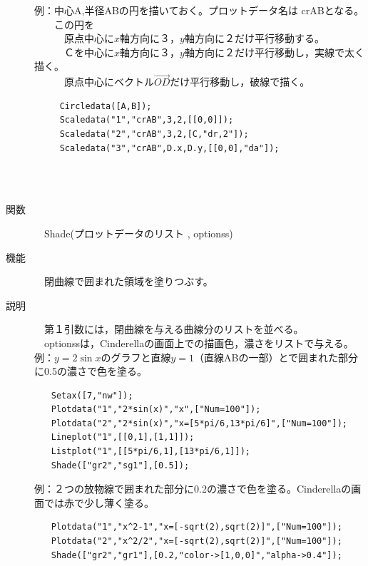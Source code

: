 \documentclass[papersize,a4paper,12pt,uplatex]{jsarticle}
\begin{document}
\begin{description}
例：中心A,半径ABの円を描いておく。プロットデータ名は crABとなる。\\
　　この円を\\
　　　原点中心に$x$軸方向に３，$y$軸方向に２だけ平行移動する。\\
　　　Ｃを中心に$x$軸方向に３，$y$軸方向に２だけ平行移動し，実線で太く描く。\\
　　　原点中心にベクトル$\overrightarrow{OD} $だけ平行移動し，破線で描く。
\begin{verbatim}
　　　Circledata([A,B]);
　　　Scaledata("1","crAB",3,2,[[0,0]]);
　　　Scaledata("2","crAB",3,2,[C,"dr,2"]);
　　　Scaledata("3","crAB",D.x,D.y,[[0,0],"da"]);
\end{verbatim}
　　　　　　　\\
　\\
\hypertarget{shade}{}
\item[関数]　Shade(プロットデータのリスト , optionss)
\item[機能]　閉曲線で囲まれた領域を塗りつぶす。
\item[説明]　第１引数には，閉曲線を与える曲線分のリストを並べる。\\
　optionssは，Cinderellaの画面上での描画色，濃さをリストで与える。\\

例：$y=2\sin x$のグラフと直線$y=1$（直線ABの一部）とで囲まれた部分に0.5の濃さで色を塗る。
\begin{verbatim}
　　Setax([7,"nw"]);
　　Plotdata("1","2*sin(x)","x",["Num=100"]);
　　Plotdata("2","2*sin(x)","x=[5*pi/6,13*pi/6]",["Num=100"]);
　　Lineplot("1",[[0,1],[1,1]]);
　　Listplot("1",[[5*pi/6,1],[13*pi/6,1]]);
　　Shade(["gr2","sg1"],[0.5]);
\end{verbatim}
\begin{center}

\end{center}

例：２つの放物線で囲まれた部分に0.2の濃さで色を塗る。Cinderellaの画面では赤で少し薄く塗る。
\begin{verbatim}
　　Plotdata("1","x^2-1","x=[-sqrt(2),sqrt(2)]",["Num=100"]);
　　Plotdata("2","x^2/2","x=[-sqrt(2),sqrt(2)]",["Num=100"]);
　　Shade(["gr2","gr1"],[0.2,"color->[1,0,0]","alpha->0.4"]);
\end{verbatim}
\begin{center}

\end{center}



\end{description}
\end{document}
